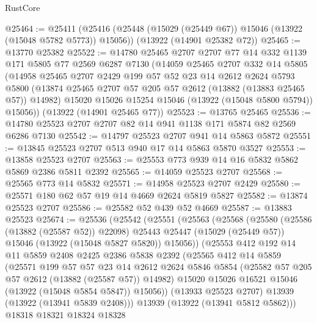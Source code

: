 \begin{lexlean}{RustCore}
\begin{coremodule}
@25464 := @25411
    (@25416 (@25448 (@15029 (@25449 @67)) @15046 (@13922 (@15048 @5782 @5773)) @15056))
    (@13922 (@14901 @25382 @72))
@25465 := @13770 @25382
@25522 := @14780
    @25465
    @2707
    @2707
    @77
    @14
    @332
    @1139
    @171
    @5805
    @77
    @2569
    @6287
    @7130
    (@14059
      @25465
      @2707
      @332
      @14
      @5805
      (@14958
        @25465
        @2707
        @2429
        @199
        @57
        @52
        @23
        @14
        @2612
        @2624
        @5793
        @5800
        (@13874 @25465 @2707 @57 @205 @57 @2612 (@13882 (@13883 @25465 @57)) @14982)
        @15020
        @15026
        @15254
        @15046
        (@13922 (@15048 @5800 @5794))
        @15056))
    (@13922 (@14901 @25465 @77))
@25523 := @13765 @25465
@25536 := @14780 @25523 @2707 @2707 @82 @14 @941 @1138 @171 @5874 @82 @2569 @6286 @7130
@25542 := @14797 @25523 @2707 @941 @14 @5863 @5872
@25551 := @13845 @25523 @2707 @513 @940 @17 @14 @5863 @5870 @3527
@25553 := @13858 @25523 @2707
@25563 := @25553 @773 @939 @14 @16 @5832 @5862 @5869 @2386 @5811 @2392
@25565 := @14059 @25523 @2707
@25568 := @25565 @773 @14 @5832
@25571 := @14958 @25523 @2707 @2429
@25580 := @25571 @180 @62 @57 @19 @14 @4669 @2624 @5819 @5827
@25582 := @13874 @25523 @2707
@25586 := @25582 @52 @439 @52 @4669
@25587 := @13883 @25523
@25674 := @25536
    (@25542
      (@25551
        (@25563
          (@25568
            (@25580
              (@25586 (@13882 (@25587 @52)) @22098)
              @25443
              @25447
              (@15029 (@25449 @57))
              @15046
              (@13922 (@15048 @5827 @5820))
              @15056))
          (@25553
            @412
            @192
            @14
            @11
            @5859
            @2408
            @2425
            @2386
            @5838
            @2392
            (@25565
              @412
              @14
              @5859
              (@25571
                @199
                @57
                @57
                @23
                @14
                @2612
                @2624
                @5846
                @5854
                (@25582 @57 @205 @57 @2612 (@13882 (@25587 @57)) @14982)
                @15020
                @15026
                @16521
                @15046
                (@13922 (@15048 @5854 @5847))
                @15056))
            (@13933 @25523 @2707)
            @13939
            (@13922 (@13941 @5839 @2408)))
          @13939
          (@13922 (@13941 @5812 @5862)))
        @18318
        @18321
        @18324
        @18328

\end{coremodule}
\end{lexlean}
